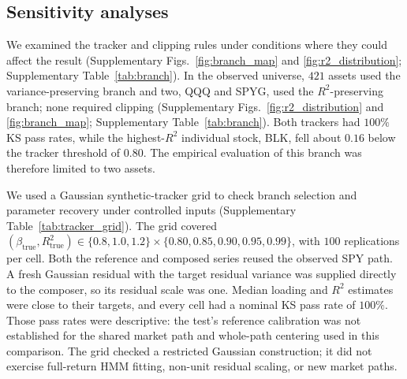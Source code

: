 \begin{table}[H]
  \centering
  \caption{\textbf{Jump settings under naive and corrected multi-asset
    composition.} Each setting used $1{,}000$ replications per asset
    across four seeds, with identical asset and market draws for the
    two composition methods. SPY was simulated in both windows,
    and the correction used each simulated market path's variance
    and each asset draw's variance. Entries are equal-weight
    cross-ticker means of per-path metrics.
    Kolmogorov--Smirnov (KS) and Anderson--Darling (AD) report
    non-rejection rates at $\alpha=0.05$. ACF$_{25}$ and ACF$_{60}$
    are absolute-return autocorrelation errors through lags $25$
    and $60$, calculated within each path before averaging over
    replications and assets; lower values indicate better
    temporal fit. $V_{\gen}=\Var(g_i)/\sigma_{\gen,i}^2$ compares
    composed variance with the active generator's variance, rather
    than observed variance.}
  \label{tab:jump_ablation}
  \footnotesize
  \setlength{\tabcolsep}{4pt}
  
\end{table}

\subsection{Sensitivity analyses}

We examined the tracker and clipping rules under conditions where
they could affect the result (Supplementary Figs.~\ref{fig:branch_map} and
\ref{fig:r2_distribution}; Supplementary Table~\ref{tab:branch}). In the observed universe, $421$ assets
used the variance-preserving branch and two, QQQ and SPYG, used the
$R^2$-preserving branch; none required clipping
(Supplementary Figs.~\ref{fig:r2_distribution} and \ref{fig:branch_map};
Supplementary Table~\ref{tab:branch}). Both trackers had $100\%$ KS pass rates,
while the highest-$R^2$ individual stock, BLK, fell about $0.16$
below the tracker threshold of $0.80$. The empirical evaluation of this branch was therefore limited to two assets.

We used a Gaussian synthetic-tracker grid to check branch selection and
parameter recovery under controlled inputs (Supplementary Table~\ref{tab:tracker_grid}).
The grid covered
$(\beta_{\mathrm{true}},R^2_{\mathrm{true}})\in\{0.8,1.0,1.2\}
\times\{0.80,0.85,0.90,0.95,0.99\}$, with $100$ replications per cell.
Both the reference and composed series reused the observed SPY path.
A fresh Gaussian residual with the target residual variance was supplied
directly to the composer, so its residual scale was one. Median loading
and $R^2$ estimates were close to their targets, and every cell had a
nominal KS pass rate of $100\%$. Those pass rates were descriptive:
the test's reference calibration was not established for the shared
market path and whole-path centering used in this comparison. The grid
checked a restricted Gaussian construction; it did not exercise
full-return HMM fitting, non-unit residual scaling, or new market paths.


